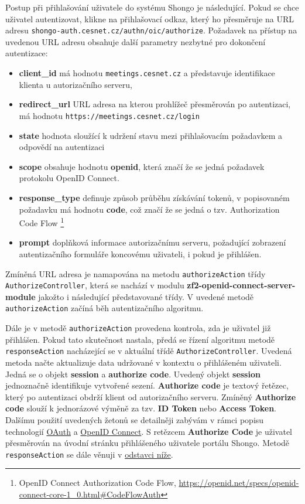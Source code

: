 \documentclass[
  printed, %
  twoside, %
  table,   %
  nolof,     %
  nolot,     %
]{fithesis3}
\begin{document}
Postup při přihlašování uživatele do systému Shongo je následující. Pokud se chce uživatel autentizovat, klikne na přihlašovací odkaz, který ho přesměruje na URL adresu \texttt{shongo-auth.cesnet.cz/authn/oic/authorize}. Požadavek na přístup na uvedenou URL adresu obsahuje další parametry nezbytné pro dokončení autentizace:
\begin{itemize}
    \item \textbf{client\_id} má hodnotu \texttt{meetings.cesnet.cz} a představuje identifikace klienta u autorizačního serveru,
    \item \textbf{redirect\_url} URL adresa na kterou prohlížeč přesměrován po autentizaci, má hodnotu \texttt{https://meetings.cesnet.cz/login} 
    \item \textbf{state} hodnota sloužící k udržení stavu mezi přihlašovacím požadavkem a odpovědí na autentizaci 
    \item \textbf{scope} obsahuje hodnotu \textbf{openid}, která značí že se jedná požadavek protokolu OpenID Connect. 
    \item \textbf{response\_type} definuje způsob průběhu získávání tokenů, v popisovaném požadavku má hodnotu \textbf{code}, což značí že se jedná o tzv. Authorization Code Flow \footnote{OpenID Connect Authorization Code Flow, \url{https://openid.net/specs/openid-connect-core-1_0.html\#CodeFlowAuth}}
    \item \textbf{prompt} doplňková informace autorizačnímu serveru, požadující zobrazení autentizačního formuláře koncovému uživateli, i pokud je přihlášen. 
\end{itemize}


Zmíněná URL adresa je namapována na metodu \texttt{authorizeAction} třídy \texttt{AuthorizeController}, která se nachází v modulu \textbf{zf2-openid-connect-server-module} jakožto i následující představované třídy. V uvedené metodě \texttt{authorizeAction} začíná běh autentizačního algoritmu. \par 

Dále je v metodě \texttt{authorizeAction} provedena kontrola, zda je uživatel již přihlášen. Pokud tato skutečnost nastala, předá se řízení algoritmu metodě \texttt{responseAction} nacházející se v aktuální třídě \texttt{AuthorizeController}. Uvedená metoda načte  aktualizuje data udržované v kontextu o přihlášeném uživateli. Jedná se o objekt \textbf{session} a \textbf{authorize code}. Uvedený objekt \textbf{session} jednoznačně identifikuje vytvořené sezení. \textbf{Authorize code} je textový řetězec, který po autentizaci obdrží klient od autorizačního serveru. Zmíněný \textbf{Authorize code} slouží k jednorázové výměně za tzv. \textbf{ID Token} nebo \textbf{Access Token}. Dalšímu použití uvedených žetonů se detailněji zabývám v rámci popisu technologií \hyperref[sec:oauth]{OAuth} a \hyperref[sec:oidc]{OpenID Connect}. S retězcem \textbf{Authorize Code} je uživatel přesměrován na úvodní stránku přihlášeného uživatele portálu Shongo. Metodě \texttt{responseAction} se dále věnuji v \hyperref[sec:responseAction]{odstavci níže}. \par 
\end{document}
